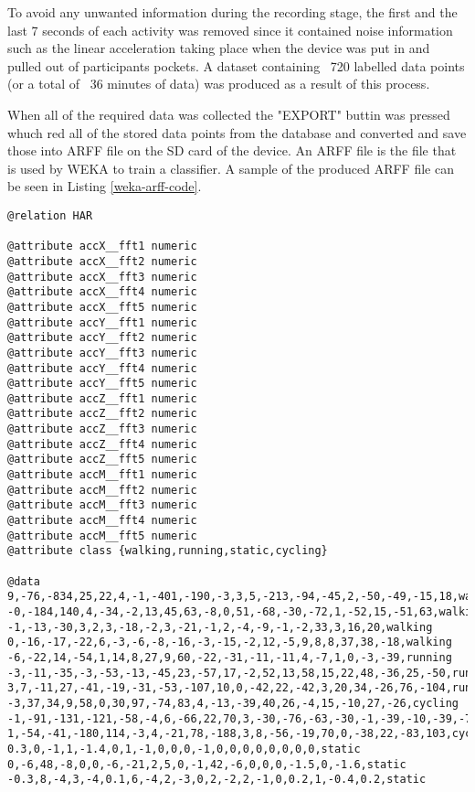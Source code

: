    To avoid any unwanted information during the recording stage, the first and the last 7 seconds of each activity was removed since it contained noise information such as the linear acceleration taking place when the device was put in and pulled out of participants pockets. A dataset containing ~720 labelled data points (or a total of ~36 minutes of data) was produced as a result of this process. 
    
    When all of the required data was collected the "EXPORT" buttin was pressed whuch red all of the stored data points from the database and converted and save those into ARFF file on the SD card of the device. An ARFF file is the file that is used by WEKA to train a classifier. A sample of the produced ARFF file can be seen in Listing \ref{weka-arff-code}.
    
\begin{lstlisting}[caption=WEKA ARFF file extract,
label=weka-arff-code,captionpos=b, frame=single,basicstyle=\small,float,floatplacement=H,breaklines=true]
@relation HAR
    
@attribute accX__fft1 numeric
@attribute accX__fft2 numeric
@attribute accX__fft3 numeric
@attribute accX__fft4 numeric
@attribute accX__fft5 numeric
@attribute accY__fft1 numeric
@attribute accY__fft2 numeric
@attribute accY__fft3 numeric
@attribute accY__fft4 numeric
@attribute accY__fft5 numeric
@attribute accZ__fft1 numeric
@attribute accZ__fft2 numeric
@attribute accZ__fft3 numeric
@attribute accZ__fft4 numeric
@attribute accZ__fft5 numeric
@attribute accM__fft1 numeric
@attribute accM__fft2 numeric
@attribute accM__fft3 numeric
@attribute accM__fft4 numeric
@attribute accM__fft5 numeric
@attribute class {walking,running,static,cycling}
    
@data
9,-76,-834,25,22,4,-1,-401,-190,-3,3,5,-213,-94,-45,2,-50,-49,-15,18,walking
-0,-184,140,4,-34,-2,13,45,63,-8,0,51,-68,-30,-72,1,-52,15,-51,63,walking
-1,-13,-30,3,2,3,-18,-2,3,-21,-1,2,-4,-9,-1,-2,33,3,16,20,walking
0,-16,-17,-22,6,-3,-6,-8,-16,-3,-15,-2,12,-5,9,8,8,37,38,-18,walking
-6,-22,14,-54,1,14,8,27,9,60,-22,-31,-11,-11,4,-7,1,0,-3,-39,running
-3,-11,-35,-3,-53,-13,-45,23,-57,17,-2,52,13,58,15,22,48,-36,25,-50,running
3,7,-11,27,-41,-19,-31,-53,-107,10,0,-42,22,-42,3,20,34,-26,76,-104,running
-3,37,34,9,58,0,30,97,-74,83,4,-13,-39,40,26,-4,15,-10,27,-26,cycling
-1,-91,-131,-121,-58,-4,6,-66,22,70,3,-30,-76,-63,-30,-1,-39,-10,-39,-76,cycling
1,-54,-41,-180,114,-3,4,-21,78,-188,3,8,-56,-19,70,0,-38,22,-83,103,cycling
0.3,0,-1,1,-1.4,0,1,-1,0,0,0,-1,0,0,0,0,0,0,0,0,static
0,-6,48,-8,0,0,-6,-21,2,5,0,-1,42,-6,0,0,0,-1.5,0,-1.6,static
-0.3,8,-4,3,-4,0.1,6,-4,2,-3,0,2,-2,2,-1,0,0.2,1,-0.4,0.2,static
\end{lstlisting}
    
